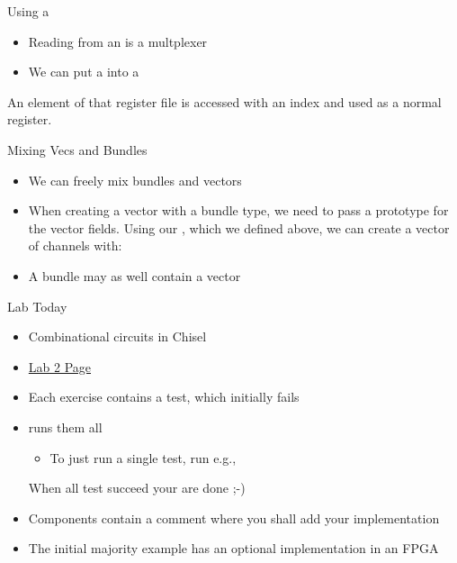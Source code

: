 \begin{frame}[fragile]{Using a }
\begin{itemize}
\item Reading from an  is a multplexer
\item We can put a  into a 
\end{itemize}
\noindent An element of that register file is accessed with an index and used as a normal register.

\end{frame}


\begin{frame}[fragile]{Mixing Vecs and Bundles}
\begin{itemize}
\item We can freely mix bundles and vectors
\item When creating a vector with a bundle
type, we need to pass a prototype for the vector fields. Using our
, which we defined above, we can create a vector of channels with:
\end{itemize}
\begin{itemize}
\item A bundle may as well contain a vector
\end{itemize}
\end{frame}

\begin{frame}[fragile]{Lab Today}
\begin{itemize}
\item Combinational circuits in Chisel
\item \href{https://github.com/schoeberl/chisel-lab/tree/master/lab2}{Lab 2 Page}
\item Each exercise contains a test, which initially fails
\item {} runs them all
\begin{itemize}
\item To just run a single test, run e.g.,\\
\end{itemize}
When all test succeed your are done ;-)
\item Components contain a comment where you shall add your implementation
\item The initial majority example has an optional implementation in an FPGA
\end{itemize}
\end{frame}

